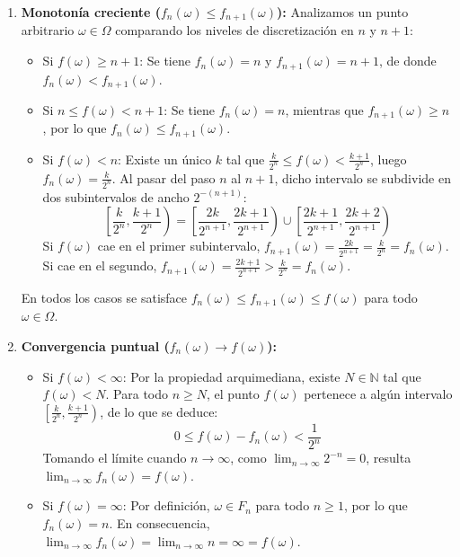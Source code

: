 \begin{problema}
\begin{enumerate}[label=\alph*)]
    \item \textbf{Monotonía creciente ($f_n(\omega) \le f_{n+1}(\omega)$):}
    Analizamos un punto arbitrario $\omega \in \Omega$ comparando los niveles de discretización en $n$ y $n+1$:
    \begin{itemize}
        \item Si $f(\omega) \ge n+1$: Se tiene $f_n(\omega) = n$ y $f_{n+1}(\omega) = n+1$, de donde $f_n(\omega) < f_{n+1}(\omega)$.
        \item Si $n \le f(\omega) < n+1$: Se tiene $f_n(\omega) = n$, mientras que $f_{n+1}(\omega) \ge n$, por lo que $f_n(\omega) \le f_{n+1}(\omega)$.
        \item Si $f(\omega) < n$: Existe un único $k$ tal que $\frac{k}{2^n} \le f(\omega) < \frac{k+1}{2^n}$, luego $f_n(\omega) = \frac{k}{2^n}$. Al pasar del paso $n$ al $n+1$, dicho intervalo se subdivide en dos subintervalos de ancho $2^{-(n+1)}$:
        \[
            \left[ \frac{k}{2^n}, \frac{k+1}{2^n} \right) = \left[ \frac{2k}{2^{n+1}}, \frac{2k+1}{2^{n+1}} \right) \cup \left[ \frac{2k+1}{2^{n+1}}, \frac{2k+2}{2^{n+1}} \right)
        \]
        Si $f(\omega)$ cae en el primer subintervalo, $f_{n+1}(\omega) = \frac{2k}{2^{n+1}} = \frac{k}{2^n} = f_n(\omega)$. Si cae en el segundo, $f_{n+1}(\omega) = \frac{2k+1}{2^{n+1}} > \frac{k}{2^n} = f_n(\omega)$.
    \end{itemize}
    En todos los casos se satisface $f_n(\omega) \le f_{n+1}(\omega) \le f(\omega)$ para todo $\omega \in \Omega$.

    \item \textbf{Convergencia puntual ($f_n(\omega) \to f(\omega)$):}
    \begin{itemize}
        \item Si $f(\omega) < \infty$: Por la propiedad arquimediana, existe $N \in \mathbb{N}$ tal que $f(\omega) < N$. Para todo $n \ge N$, el punto $f(\omega)$ pertenece a algún intervalo $\left[ \frac{k}{2^n}, \frac{k+1}{2^n} \right)$, de lo que se deduce:
        \[
            0 \le f(\omega) - f_n(\omega) < \frac{1}{2^n}
        \]
        Tomando el límite cuando $n \to \infty$, como $\lim_{n \to \infty} 2^{-n} = 0$, resulta $\lim_{n \to \infty} f_n(\omega) = f(\omega)$.
        \item Si $f(\omega) = \infty$: Por definición, $\omega \in F_n$ para todo $n \ge 1$, por lo que $f_n(\omega) = n$. En consecuencia, $\lim_{n \to \infty} f_n(\omega) = \lim_{n \to \infty} n = \infty = f(\omega)$.
    \end{itemize}
\end{enumerate}


\end{problema}
